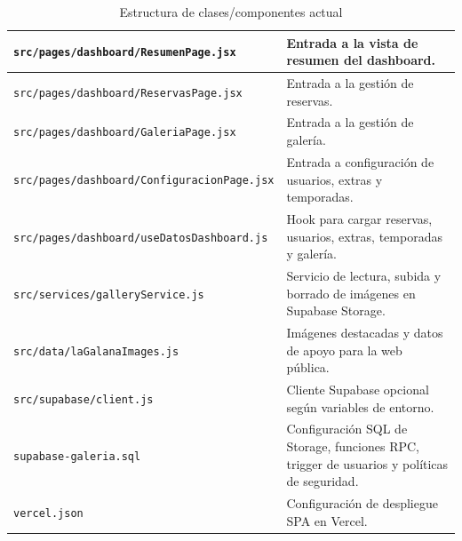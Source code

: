 \documentclass[11pt,a4paper]{article}
\begin{document}
\begin{table}[H]
\begin{tabularx}{\textwidth}{|p{6.0cm}|X|}
\texttt{src/pages/dashboard/ResumenPage.jsx} & Entrada a la vista de resumen del dashboard. \\
\hline
\texttt{src/pages/dashboard/ReservasPage.jsx} & Entrada a la gestión de reservas. \\
\hline
\texttt{src/pages/dashboard/GaleriaPage.jsx} & Entrada a la gestión de galería. \\
\hline
\texttt{src/pages/dashboard/ConfiguracionPage.jsx} & Entrada a configuración de usuarios, extras y temporadas. \\
\hline
\texttt{src/pages/dashboard/useDatosDashboard.js} & Hook para cargar reservas, usuarios, extras, temporadas y galería. \\
\hline
\texttt{src/services/galleryService.js} & Servicio de lectura, subida y borrado de imágenes en Supabase Storage. \\
\hline
\texttt{src/data/laGalanaImages.js} & Imágenes destacadas y datos de apoyo para la web pública. \\
\hline
\texttt{src/supabase/client.js} & Cliente Supabase opcional según variables de entorno. \\
\hline
\texttt{supabase-galeria.sql} & Configuración SQL de Storage, funciones RPC, trigger de usuarios y políticas de seguridad. \\
\hline
\texttt{vercel.json} & Configuración de despliegue SPA en Vercel. \\
\hline
\end{tabularx}
\caption{Estructura de clases/componentes actual}
\end{table}
\end{document}
